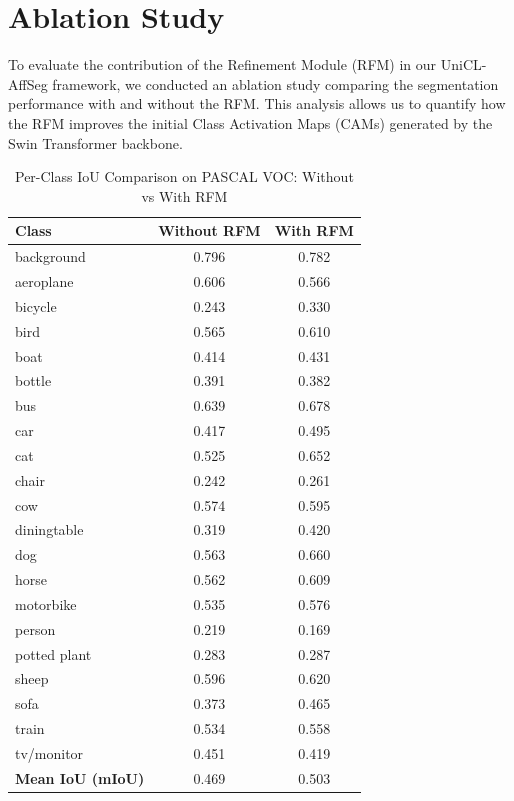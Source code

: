 \section{Ablation Study}
\label{sec:ablation_study}

To evaluate the contribution of the Refinement Module (RFM) in our UniCL-AffSeg framework, we conducted an ablation study comparing the segmentation performance with and without the RFM. This analysis allows us to quantify how the RFM improves the initial Class Activation Maps (CAMs) generated by the Swin Transformer backbone.

\begin{table}[ht!]
\centering
\caption{Per-Class IoU Comparison on PASCAL VOC: Without vs With RFM}
\begin{tabular}{ l c c }
\hline
\textbf{Class} & \textbf{Without RFM} & \textbf{With RFM} \\ \hline
background    & 0.796 & 0.782 \\
aeroplane     & 0.606 & 0.566 \\
bicycle       & 0.243 & 0.330 \\
bird          & 0.565 & 0.610 \\
boat          & 0.414 & 0.431 \\
bottle        & 0.391 & 0.382 \\
bus           & 0.639 & 0.678 \\
car           & 0.417 & 0.495 \\
cat           & 0.525 & 0.652 \\
chair         & 0.242 & 0.261 \\
cow           & 0.574 & 0.595 \\
diningtable   & 0.319 & 0.420 \\
dog           & 0.563 & 0.660 \\
horse         & 0.562 & 0.609 \\
motorbike     & 0.535 & 0.576 \\
person        & 0.219 & 0.169 \\
potted plant  & 0.283 & 0.287 \\
sheep         & 0.596 & 0.620 \\
sofa          & 0.373 & 0.465 \\
train         & 0.534 & 0.558 \\
tv/monitor    & 0.451 & 0.419 \\ \hline
\textbf{Mean IoU (mIoU)} & 0.469 & 0.503 \\ \hline
\end{tabular}
\label{tab:ablation_rfm_comparison}
\end{table}

